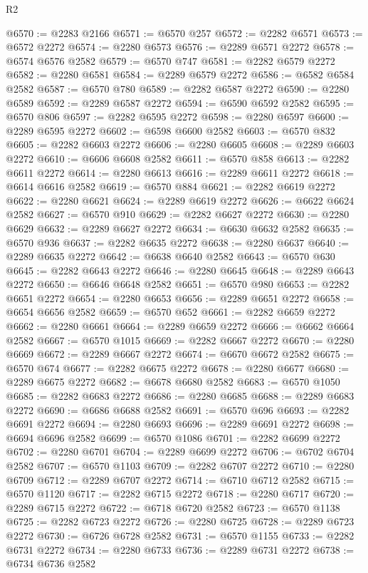 \begin{lexlean}{R2}
\begin{coremodule}
@6570 := @2283 @2166
@6571 := @6570 @257
@6572 := @2282 @6571
@6573 := @6572 @2272
@6574 := @2280 @6573
@6576 := @2289 @6571 @2272
@6578 := @6574 @6576 @2582
@6579 := @6570 @747
@6581 := @2282 @6579 @2272
@6582 := @2280 @6581
@6584 := @2289 @6579 @2272
@6586 := @6582 @6584 @2582
@6587 := @6570 @780
@6589 := @2282 @6587 @2272
@6590 := @2280 @6589
@6592 := @2289 @6587 @2272
@6594 := @6590 @6592 @2582
@6595 := @6570 @806
@6597 := @2282 @6595 @2272
@6598 := @2280 @6597
@6600 := @2289 @6595 @2272
@6602 := @6598 @6600 @2582
@6603 := @6570 @832
@6605 := @2282 @6603 @2272
@6606 := @2280 @6605
@6608 := @2289 @6603 @2272
@6610 := @6606 @6608 @2582
@6611 := @6570 @858
@6613 := @2282 @6611 @2272
@6614 := @2280 @6613
@6616 := @2289 @6611 @2272
@6618 := @6614 @6616 @2582
@6619 := @6570 @884
@6621 := @2282 @6619 @2272
@6622 := @2280 @6621
@6624 := @2289 @6619 @2272
@6626 := @6622 @6624 @2582
@6627 := @6570 @910
@6629 := @2282 @6627 @2272
@6630 := @2280 @6629
@6632 := @2289 @6627 @2272
@6634 := @6630 @6632 @2582
@6635 := @6570 @936
@6637 := @2282 @6635 @2272
@6638 := @2280 @6637
@6640 := @2289 @6635 @2272
@6642 := @6638 @6640 @2582
@6643 := @6570 @630
@6645 := @2282 @6643 @2272
@6646 := @2280 @6645
@6648 := @2289 @6643 @2272
@6650 := @6646 @6648 @2582
@6651 := @6570 @980
@6653 := @2282 @6651 @2272
@6654 := @2280 @6653
@6656 := @2289 @6651 @2272
@6658 := @6654 @6656 @2582
@6659 := @6570 @652
@6661 := @2282 @6659 @2272
@6662 := @2280 @6661
@6664 := @2289 @6659 @2272
@6666 := @6662 @6664 @2582
@6667 := @6570 @1015
@6669 := @2282 @6667 @2272
@6670 := @2280 @6669
@6672 := @2289 @6667 @2272
@6674 := @6670 @6672 @2582
@6675 := @6570 @674
@6677 := @2282 @6675 @2272
@6678 := @2280 @6677
@6680 := @2289 @6675 @2272
@6682 := @6678 @6680 @2582
@6683 := @6570 @1050
@6685 := @2282 @6683 @2272
@6686 := @2280 @6685
@6688 := @2289 @6683 @2272
@6690 := @6686 @6688 @2582
@6691 := @6570 @696
@6693 := @2282 @6691 @2272
@6694 := @2280 @6693
@6696 := @2289 @6691 @2272
@6698 := @6694 @6696 @2582
@6699 := @6570 @1086
@6701 := @2282 @6699 @2272
@6702 := @2280 @6701
@6704 := @2289 @6699 @2272
@6706 := @6702 @6704 @2582
@6707 := @6570 @1103
@6709 := @2282 @6707 @2272
@6710 := @2280 @6709
@6712 := @2289 @6707 @2272
@6714 := @6710 @6712 @2582
@6715 := @6570 @1120
@6717 := @2282 @6715 @2272
@6718 := @2280 @6717
@6720 := @2289 @6715 @2272
@6722 := @6718 @6720 @2582
@6723 := @6570 @1138
@6725 := @2282 @6723 @2272
@6726 := @2280 @6725
@6728 := @2289 @6723 @2272
@6730 := @6726 @6728 @2582
@6731 := @6570 @1155
@6733 := @2282 @6731 @2272
@6734 := @2280 @6733
@6736 := @2289 @6731 @2272
@6738 := @6734 @6736 @2582

\end{coremodule}
\end{lexlean}
